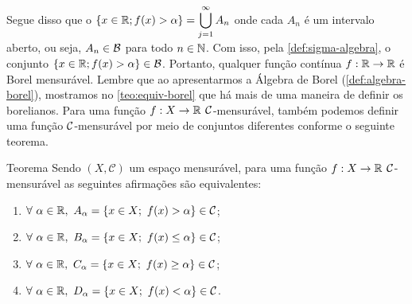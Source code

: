 	Segue disso que o
	$\{x \in \mathbb{R}; f(x) > \alpha\} = \displaystyle \bigcup_{j = 1}^\infty A_n$ onde cada $A_n$ é um intervalo aberto, ou seja, $A_n \in \operatorname{\mathcal{B}}$ para todo $n \in \operatorname{\mathbb{N}}$.
	Com isso, pela \ref{def:sigma-algebra}, o conjunto $\{x \in \mathbb{R}; f(x) > \alpha\} \in \operatorname{\mathcal{B}}$.
	Portanto, qualquer função contínua $f: \mathbb{R} \to \mathbb{R}$ é Borel mensurável.
    Lembre que ao apresentarmos a Álgebra de Borel (\ref{def:algebra-borel}), mostramos no \ref{teo:equiv-borel} que há mais de uma maneira de definir os borelianos.
    Para uma função $f: X \to \mathbb{R}$ $\operatorname{\mathcal{C}}$-mensurável, também podemos definir uma função $\operatorname{\mathcal{C}}$-mensurável por meio de conjuntos diferentes conforme o seguinte teorema.
\begin{env}{Teorema}
\label{teo:equiv-funcoes-mensuraveis}
    Sendo $(X,\mathcal{C})$ um espaço mensurável, para uma função $f: X \to \mathbb{R}$ $\operatorname{\mathcal{C}}$-mensurável as seguintes afirmações são equivalentes:
    \vspace{-0.4cm}
    \begin{multicols}{2}    	
	    \begin{enumerate}[label=(\alph*)]
	        \item $\forall \ \alpha \in \mathbb{R}, \ A_\alpha =\{x \in X;\ f(x) > \alpha \} \in \mathcal{C}$;
	        \item $\forall \ \alpha \in \mathbb{R}, \ B_\alpha =\{x \in X;\ f(x) \leq \alpha \} \in \mathcal{C}$;
	        \item $\forall \ \alpha \in \mathbb{R}, \ C_\alpha =\{x \in X;\ f(x) \geq \alpha \} \in \mathcal{C}$;
	        \item $\forall \ \alpha \in \mathbb{R}, \ D_\alpha =\{x \in X;\ f(x) < \alpha \} \in \mathcal{C}$.
	    \end{enumerate}
     \end{multicols}
	\vspace{-0.2cm}
\end{env}
